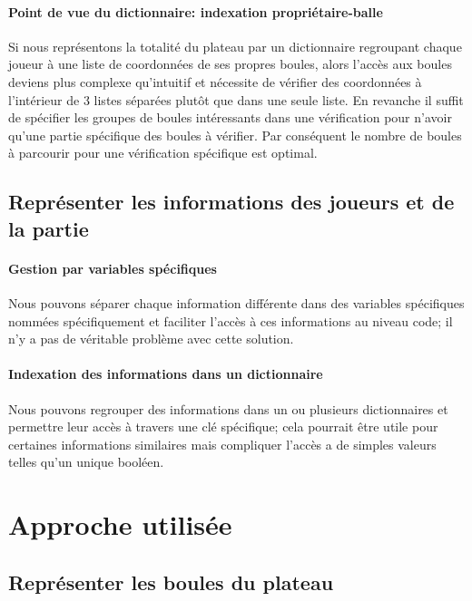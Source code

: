 \documentclass{scrreprt}
\begin{document}
				
				\paragraph{Point de vue du dictionnaire: indexation propriétaire-balle} 
				
				Si nous représentons la totalité du plateau par un dictionnaire regroupant chaque joueur à une liste de coordonnées de ses propres boules, alors l'accès aux boules deviens plus complexe qu'intuitif et nécessite de vérifier des coordonnées à l'intérieur de 3 listes séparées plutôt que dans une seule liste. En revanche il suffit de spécifier les groupes de boules intéressants dans une vérification pour n'avoir qu'une partie spécifique des boules à vérifier. Par conséquent le nombre de boules à parcourir pour une vérification spécifique est optimal.
				
			\subsection{Représenter les informations des joueurs et de la partie}
				\paragraph{Gestion par variables spécifiques} 
				
				Nous pouvons séparer chaque information différente dans des variables spécifiques nommées spécifiquement et faciliter l'accès à ces informations au niveau code; il n'y a pas de véritable problème avec cette solution.
				
				\paragraph{Indexation des informations dans un dictionnaire} 
				
				Nous pouvons regrouper des informations dans un ou plusieurs dictionnaires et permettre leur accès à travers une clé spécifique; cela pourrait être utile pour certaines informations similaires mais compliquer l'accès a de simples valeurs telles qu'un unique booléen.
		
		\section{Approche utilisée}
			\subsection{Représenter les boules du plateau}
\end{document}

